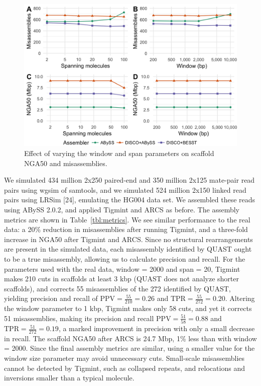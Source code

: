 \documentclass{bmcart}
\begin{document}
\begin{figure}[h!t]
\hypertarget{fig:parameters}{%
\centering
\includegraphics[width=4.8in]{figures/parameters.png}
\caption{Effect of varying the window and span parameters on scaffold NGA50 and misassemblies.}\label{fig:parameters}
}
\end{figure}

We simulated 434 million 2x250 paired-end and 350 million 2x125 mate-pair read pairs using wgsim of samtools, and we simulated 524 million 2x150 linked read pairs using LRSim {[}24{]}, emulating the HG004 data set. We assembled these reads using ABySS 2.0.2, and applied Tigmint and ARCS as before. The assembly metrics are shown in Table~\ref{tbl:metrics}. We see similar performance to the real data: a 20\% reduction in misassemblies after running Tigmint, and a three-fold increase in NGA50 after Tigmint and ARCS. Since no structural rearrangements are present in the simulated data, each misassembly identified by QUAST ought to be a true misassembly, allowing us to calculate precision and recall. For the parameters used with the real data, window = 2000 and span = 20, Tigmint makes 210 cuts in scaffolds at least 3 kbp (QUAST does not analyze shorter scaffolds), and corrects 55 misassemblies of the 272 identified by QUAST, yielding precision and recall of \(\textrm{PPV} = \frac{55}{210} = 0.26\) and \(\textrm{TPR} = \frac{55}{272} = 0.20\). Altering the window parameter to 1 kbp, Tigmint makes only 58 cuts, and yet it corrects 51 misassemblies, making its precision and recall \(\textrm{PPV} = \frac{51}{58} = 0.88\) and \(\textrm{TPR} = \frac{51}{272} = 0.19\), a marked improvement in precision with only a small decrease in recall. The scaffold NGA50 after ARCS is 24.7 Mbp, 1\% less than with window = 2000. Since the final assembly metrics are similar, using a smaller value for the window size parameter may avoid unnecessary cuts. Small-scale misassemblies cannot be detected by Tigmint, such as collapsed repeats, and relocations and inversions smaller than a typical molecule.
\end{document}
